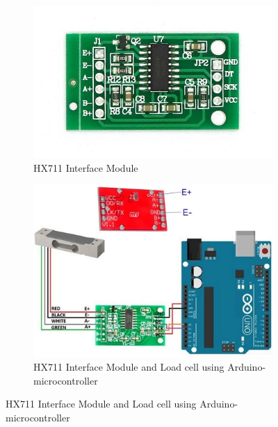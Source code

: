 \documentclass[../report.tex]{subfiles}
\begin{document}
\begin{figure}[H]
  \centering
  \begin{subfigure}[b]{0.4\linewidth}
    \includegraphics[width=\linewidth]{image/HX711-Weighing-Sensor-Dual-Channel-24-Bit-Precision-A-D-Module-Pressure-Sensor_1.jpg}
    \caption{HX711 Interface Module }
  \end{subfigure}
  \begin{subfigure}[b]{0.4\linewidth}
    \includegraphics[width=\linewidth]{image/hx711-red.jpg}
    \caption{HX711 Interface Module and Load cell using Arduino-microcontroller}
  \end{subfigure}
  
  
\end{figure}
  
\end{document}
